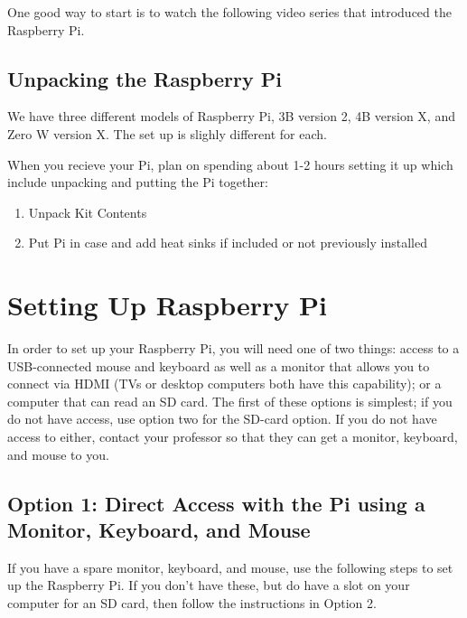 \documentclass{article}\usepackage[]{graphicx}\usepackage[]{color}
\begin{document}
One good way to start is to watch the following video series that introduced the Raspberry Pi. 


\subsection{Unpacking the Raspberry Pi}

We have three different models of Raspberry Pi, 3B version 2, 4B version X, and Zero W version X. The set up is slighly different for each. 

When you recieve your Pi, plan on spending about 1-2 hours setting it up which include unpacking and putting the Pi together: 

\begin{enumerate}

\item Unpack Kit Contents

\item Put Pi in case and add heat sinks if included or not previously installed

\end{enumerate}

\section{Setting Up Raspberry Pi}

In order to set up your Raspberry Pi, you will need one of two things: access to a USB-connected mouse and keyboard as well as a monitor that allows you to connect via HDMI (TVs or desktop computers both have this capability); or a computer that can read an SD card.  The first of these options is simplest; if you do not have access, use option two for the SD-card option.  If you do not have access to either, contact your professor so that they can get a monitor, keyboard, and mouse to you.

\subsection{Option 1: Direct Access with the Pi using a Monitor, Keyboard, and Mouse}

If you have a spare monitor, keyboard, and mouse, use the following steps to set up the Raspberry Pi. If you don't have these, but do have a slot on your computer for an SD card, then follow the instructions in Option 2.
\end{document}
